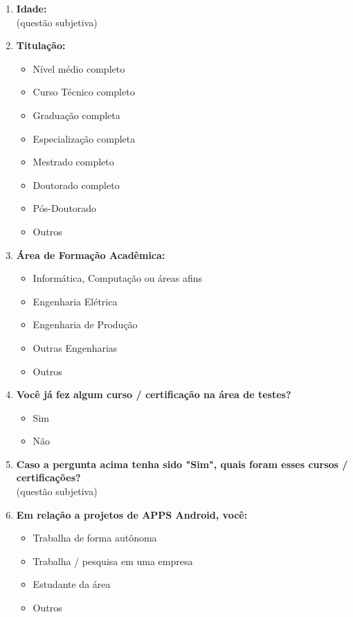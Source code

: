 \begin{enumerate}[label=\bf A\arabic*,leftmargin=1.8cm]
\begin{enumerate}[label= \arabic*]
        \item \textbf{Idade:}\\
        (questão subjetiva)
        
        \item \textbf{Titulação:}
        \begin{itemize}
            \item Nível médio completo
            \item Curso Técnico completo
            \item Graduação completa
            \item Especialização completa
            \item Mestrado completo
            \item Doutorado completo
            \item Pós-Doutorado
            \item Outros
        \end{itemize}
        
        \item \textbf{Área de Formação Acadêmica:}
        \begin{itemize}
            \item Informática, Computação ou áreas afins
            \item Engenharia Elétrica
            \item Engenharia de Produção
            \item Outras Engenharias
            \item Outros
        \end{itemize}
        
        \item \textbf{Você já fez algum curso / certificação na área de testes?}
        \begin{itemize}
            \item Sim
            \item Não
        \end{itemize}
        
        \item \textbf{Caso a pergunta acima tenha sido "Sim", quais foram esses cursos / certificações?}\\
        (questão subjetiva)
        
        \item \textbf{Em relação a projetos de \ac{APPS} Android, você:}
        \begin{itemize}
            \item Trabalha de forma autônoma
            \item Trabalha / pesquisa em uma empresa
            \item Estudante da área
            \item Outros
        \end{itemize}


\end{enumerate}
\end{enumerate}
